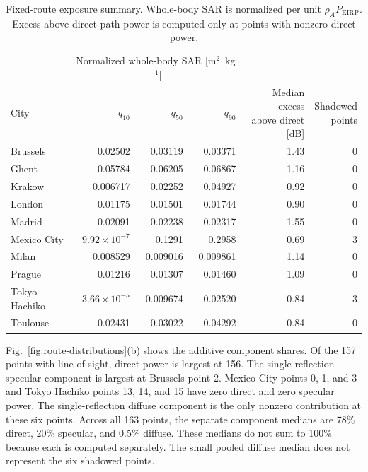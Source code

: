 \documentclass{IEEEoj}
\begin{document}
\begin{table}[!t]
\caption{Fixed-route exposure summary. Whole-body SAR is normalized per unit $\rho_A P_{\mathrm{EIRP}}$. Excess above direct-path power is computed only at points with nonzero direct power.}
\label{tab:route-results}
\centering
\begin{tabular}{lrrrrr}
\toprule
& \multicolumn{3}{c}{Normalized whole-body SAR [m$^2$~kg$^{-1}$]} & & \\
\cmidrule(lr){2-4}
City & $q_{10}$ & $q_{50}$ & $q_{90}$ & \shortstack{Median excess\\above direct [dB]} & \shortstack{Shadowed\\points} \\
\midrule
Brussels & 0.02502 & 0.03119 & 0.03371 & 1.43 & 0 \\
Ghent & 0.05784 & 0.06205 & 0.06867 & 1.16 & 0 \\
Krakow & 0.006717 & 0.02252 & 0.04927 & 0.92 & 0 \\
London & 0.01175 & 0.01501 & 0.01744 & 0.90 & 0 \\
Madrid & 0.02091 & 0.02238 & 0.02317 & 1.55 & 0 \\
Mexico City & $9.92\times10^{-7}$ & 0.1291 & 0.2958 & 0.69 & 3 \\
Milan & 0.008529 & 0.009016 & 0.009861 & 1.14 & 0 \\
Prague & 0.01216 & 0.01307 & 0.01460 & 1.09 & 0 \\
Tokyo Hachiko & $3.66\times10^{-5}$ & 0.009674 & 0.02520 & 0.84 & 3 \\
Toulouse & 0.02431 & 0.03022 & 0.04292 & 0.84 & 0 \\
\bottomrule
\end{tabular}
\end{table}

Fig.~\ref{fig:route-distributions}(b) shows the additive component shares. Of
the 157 points with line of sight, direct power is largest at 156. The
single-reflection specular component is largest at Brussels point 2. Mexico City
points 0, 1, and 3 and Tokyo Hachiko points 13, 14, and 15 have zero direct and
zero specular power. The single-reflection diffuse component is the only
nonzero contribution at these six points. Across all 163 points, the separate
component medians are 78\% direct, 20\% specular, and 0.5\% diffuse. These
medians do not sum to 100\% because each is computed separately. The small
pooled diffuse median does not represent the six shadowed points.
\end{document}
